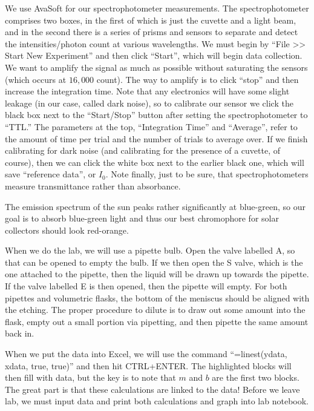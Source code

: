 \documentclass{report}
\begin{document}
We use AvaSoft for our spectrophotometer measurements. The spectrophotometer comprises two boxes, in the first of which is just the cuvette and a light beam, and in the second there is a series of prisms and sensors to separate and detect the intensities/photon count at various wavelengths. We must begin by ``File >> Start New Experiment'' and then click ``Start'', which will begin data collection. We want to amplify the signal as much as possible without saturating the sensors (which occurs at $16,000$ count). The way to amplify is to click ``stop'' and then increase the integration time. Note that any electronics will have some slight leakage (in our case, called dark noise), so to calibrate our sensor we click the black box next to the ``Start/Stop'' button after setting the spectrophotometer to ``TTL.'' The parameters at the top, ``Integration Time'' and ``Average'', refer to the amount of time per trial and the number of trials to average over. If we finish calibrating for dark noise (and calibrating for the presence of a cuvette, of course), then we can click the white box next to the earlier black one, which will save ``reference data'', or $I_0$. Note finally, just to be sure, that spectrophotometers measure transmittance rather than absorbance. 

The emission spectrum of the sun peaks rather significantly at blue-green, so our goal is to absorb blue-green light and thus our best chromophore for solar collectors should look red-orange. 

When we do the lab, we will use a pipette bulb. Open the valve labelled A, so that can be opened to empty the bulb. If we then open the S valve, which is the one attached to the pipette, then the liquid will be drawn up towards the pipette. If the valve labelled E is then opened, then the pipette will empty. For both pipettes and volumetric flasks, the bottom of the meniscus should be aligned with the etching. The proper procedure to dilute is to draw out some amount into the flask, empty out a small portion via pipetting, and then pipette the same amount back in. 

When we put the data into Excel, we will use the command ``=linest(ydata, xdata, true, true)'' and then hit CTRL+ENTER. The highlighted blocks will then fill with data, but the key is to note that $m$ and $b$ are the first two blocks. The great part is that these calculations are linked to the data! Before we leave lab, we must input data and print both calculations and graph into lab notebook.
\end{document}
